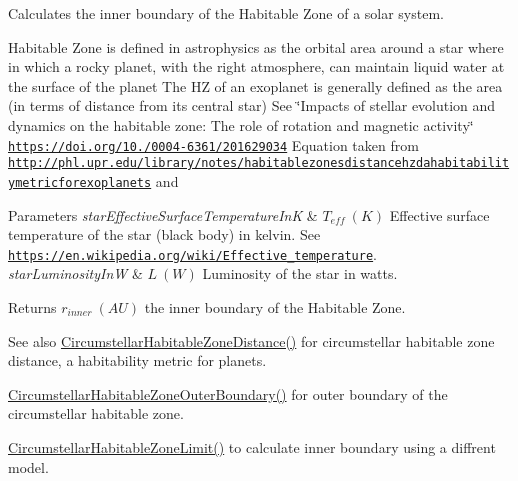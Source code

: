 Calculates the inner boundary of the Habitable Zone of a solar system. 

Habitable Zone is defined in astrophysics as the orbital area around a star where in which a rocky planet, with the right atmosphere, can maintain liquid water at the surface of the planet The HZ of an exoplanet is generally defined as the area (in terms of distance from its central star) See \char`\"{}\+Impacts of stellar evolution and dynamics on the habitable zone\+: The role of rotation and magnetic activity\char`\"{} \href{https://doi.org/10.1051/0004-6361/201629034}{\tt https\+://doi.\+org/10./0004-\/6361/201629034} Equation taken from \href{http://phl.upr.edu/library/notes/habitablezonesdistancehzdahabitabilitymetricforexoplanets}{\tt http\+://phl.\+upr.\+edu/library/notes/habitablezonesdistancehzdahabitabilitymetricforexoplanets} and 
\begin{DoxyParams}{Parameters}
{\em star\+Effective\+Surface\+Temperature\+InK} & $T_{eff}\ (K)$ Effective surface temperature of the star (black body) in kelvin. See \href{https://en.wikipedia.org/wiki/Effective_temperature}{\tt https\+://en.\+wikipedia.\+org/wiki/\+Effective\+\_\+temperature}. \\
\hline
{\em star\+Luminosity\+InW} & $L\ (W)$ Luminosity of the star in watts. \\
\hline
\end{DoxyParams}
\begin{DoxyReturn}{Returns}
$r_{inner}\ (AU)$ the inner boundary of the Habitable Zone. 
\end{DoxyReturn}
\begin{DoxySeeAlso}{See also}
\mbox{\hyperlink{group___e_g_x_phys-_circumstellar_habitable_zone_limit_gaf289fb8f037ece66d850f7d827f83752}{Circumstellar\+Habitable\+Zone\+Distance()}} for circumstellar habitable zone distance, a habitability metric for planets. 

\mbox{\hyperlink{group___e_g_x_phys-_circumstellar_habitable_zone_limit_ga3a6dbbdaddddd071cb1f0a20e40d83bd}{Circumstellar\+Habitable\+Zone\+Outer\+Boundary()}} for outer boundary of the circumstellar habitable zone. 

\mbox{\hyperlink{group___e_g_x_phys-_circumstellar_habitable_zone_limit_ga809f4c557ce6d2fe566a69c2a8a5d41b}{Circumstellar\+Habitable\+Zone\+Limit()}} to calculate inner boundary using a diffrent model. 
\end{DoxySeeAlso}
\mbox{\label{group___e_g_x_phys-_circumstellar_habitable_zone_limit_ga809f4c557ce6d2fe566a69c2a8a5d41b}} 
